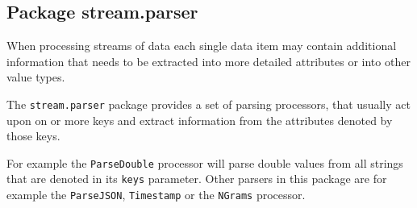 \subsection{Package stream.parser}

When processing streams of data each single data item may contain
additional information that needs to be extracted into more detailed
attributes or into other value types.

The \texttt{stream.parser} package provides a set of parsing processors,
that usually act upon on or more keys and extract information from the
attributes denoted by those keys.

For example the \texttt{ParseDouble} processor will parse double values
from all strings that are denoted in its \texttt{keys} parameter. Other
parsers in this package are for example the \texttt{ParseJSON},
\texttt{Timestamp} or the \texttt{NGrams} processor.





